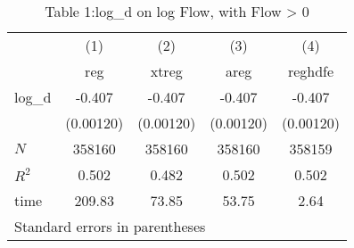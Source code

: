 \begin{table}[htbp]\centering
\caption{Table 1:log\_d on log Flow, with Flow > 0}
\begin{tabular}{l*{4}{c}}
\hline\hline
            &\multicolumn{1}{c}{(1)}&\multicolumn{1}{c}{(2)}&\multicolumn{1}{c}{(3)}&\multicolumn{1}{c}{(4)}\\
            &\multicolumn{1}{c}{reg}&\multicolumn{1}{c}{xtreg}&\multicolumn{1}{c}{areg}&\multicolumn{1}{c}{reghdfe}\\
\hline
log\_d       &      -0.407&      -0.407&      -0.407&      -0.407\\
            &   (0.00120)&   (0.00120)&   (0.00120)&   (0.00120)\\
\hline
\(N\)       &      358160&      358160&      358160&      358159\\
\(R^{2}\)   &       0.502&       0.482&       0.502&       0.502\\
time        &      209.83&       73.85&       53.75&        2.64\\
\hline\hline
\multicolumn{5}{l}{\footnotesize Standard errors in parentheses}\\
\end{tabular}
\end{table}
